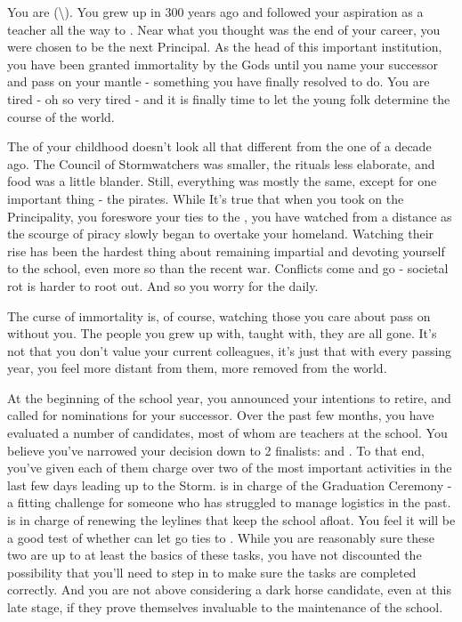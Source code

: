 \documentclass[char]{GL2020}
\begin{document}
\name{\cPrincipal{}}


You are \cPrincipal{} (\cPrincipal{\they}\textbackslash\cPrincipal{\them}). You grew up in \pShip{} 300 years ago and followed your aspiration as a teacher all the way to \pSchool{}. Near what you thought was the end of your career, you were chosen to be the next Principal. As the head of this important institution, you have been granted immortality by the Gods until you name your successor and pass on your mantle - something you have finally resolved to do. You are tired - oh so very tired - and it is finally time to let the young folk determine the course of the world.

The \pShip{} of your childhood doesn’t look all that different from the one of a decade ago. The Council of Stormwatchers was smaller, the rituals less elaborate, and food was a little blander. Still, everything was mostly the same, except for one important thing - the pirates. While It’s true that when you took on the Principality, you foreswore your ties to the \pShippies{}, you have watched from a distance as the scourge of piracy slowly began to overtake your homeland. Watching their rise has been the hardest thing about remaining impartial and devoting yourself to the school, even more so than the recent war. Conflicts come and go - societal rot is harder to root out. And so you worry for the \pShip{} daily.

The curse of immortality is, of course, watching those you care about pass on without you. The people you grew up with, taught with, they are all gone. It’s not that you don’t value your current colleagues, it's just that with every passing year, you feel more distant from them, more removed from the world.

At the beginning of the school year, you announced your intentions to retire, and called for nominations for your successor. Over the past few months, you have evaluated a number of candidates, most of whom are teachers at the school. You believe you’ve narrowed your decision down to 2 finalists: \cMusic{} and \cBeetle{}. To that end, you’ve given each of them charge over two of the most important activities in the last few days leading up to the Storm. \cMusic{} is in charge of the Graduation Ceremony - a fitting challenge for someone who has struggled to manage logistics in the past. \cBeetle{} is in charge of renewing the leylines that keep the school afloat. You feel it will be a good test of whether \cBeetle{\they} can let go \cBeetle{\their} ties to \pTech{}. While you are reasonably sure these two are up to at least the basics of these tasks, you have not discounted the possibility that you’ll need to step in to make sure the tasks are completed correctly. And you are not above considering a dark horse candidate, even at this late stage, if they prove themselves invaluable to the maintenance of the school.
\end{document}
